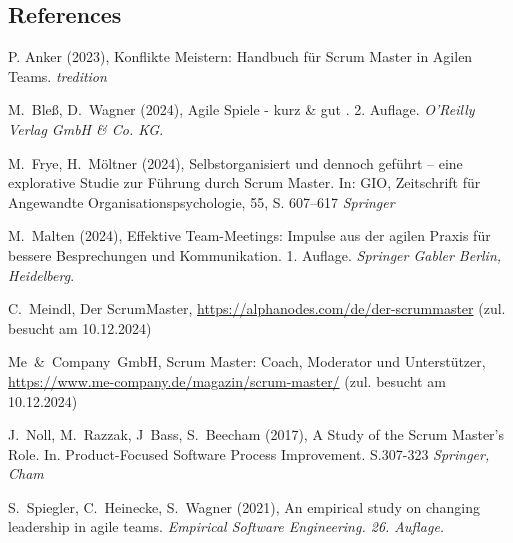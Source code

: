 \documentclass[5pt, final]{beamer}
\begin{document}
\begin{frame}[t]
\begin{multicols}{3}
			
			
			\subsection{References}
						
			\begin{thebibliography}{99}
				
%				
%				
				
				 P. Anker (2023), Konflikte Meistern: Handbuch für Scrum Master in Agilen Teams. \textit{tredition}
				
				 M.~Bleß, D.~Wagner (2024), Agile Spiele - kurz \& gut . 2. Auflage. \textit{O'Reilly Verlag GmbH \& Co. KG}.
				
				 M.~Frye, H.~Möltner (2024), Selbstorganisiert und dennoch geführt – eine explorative Studie zur Führung durch Scrum Master. In: GIO, Zeitschrift für Angewandte Organisationspsychologie, 55, S. 607–617 \textit{Springer}
				
				 M.~Malten (2024), Effektive Team-Meetings: Impulse aus der agilen Praxis für bessere Besprechungen und Kommunikation. 1. Auflage. \textit{Springer Gabler Berlin, Heidelberg}.
				
				 C.~Meindl, Der ScrumMaster, \url{https://alphanodes.com/de/der-scrummaster} (zul. besucht am 10.12.2024)
				
				 Me~\&~Company~GmbH, Scrum Master: Coach, Moderator und Unterstützer, \url{https://www.me-company.de/magazin/scrum-master/} (zul. besucht am 10.12.2024)
				
				 J.~Noll, M.~Razzak, J~Bass, S.~Beecham (2017), A Study of the Scrum Master's Role. In. Product-Focused Software Process Improvement. S.307-323 \textit{Springer, Cham}
								
				 S.~Spiegler, C.~Heinecke, S.~Wagner (2021), An empirical study on changing leadership in agile teams. 
				\textit{Empirical Software Engineering. 26. Auflage.}
						                

\end{thebibliography}
\end{multicols}
\end{frame}
\end{document}

